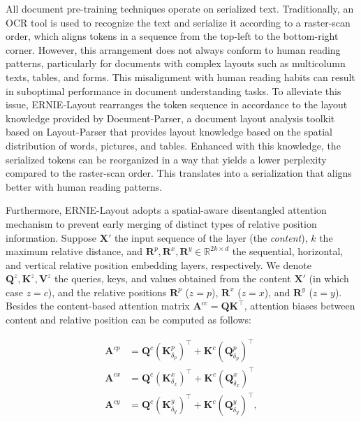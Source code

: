 All document pre-training techniques operate on serialized text. Traditionally, an OCR tool is used to recognize the text and serialize it according to a raster-scan order, which aligns tokens in a sequence from the top-left to the bottom-right corner. However, this arrangement does not always conform to human reading patterns, particularly for documents with complex layouts such as multicolumn texts, tables, and forms. This misalignment with human reading habits can result in suboptimal performance in document understanding tasks. To alleviate this issue, ERNIE-Layout \citep{peng2022ernie} rearranges the token sequence in accordance to the layout knowledge provided by Document-Parser, a document layout analysis toolkit based on Layout-Parser \citep{shen2021layoutparser} that provides layout knowledge based on the spatial distribution of words, pictures, and tables. Enhanced with this knowledge, the serialized tokens can be reorganized in a way that yields a lower perplexity compared to the raster-scan order. This translates into a serialization that aligns better with human reading patterns. 

Furthermore, ERNIE-Layout adopts a spatial-aware disentangled attention mechanism to prevent early merging of distinct types of relative position information. Suppose $\bm{X'}$ the input sequence of the layer (the \textit{content}), $k$ the maximum relative distance, and $\bm{R}^p, \bm{R}^x, \bm{R}^y \in \mathbb{R}^{2k \times d}$ the sequential, horizontal, and vertical relative position embedding layers, respectively. We denote $\bm{Q}^z, \bm{K}^z, \bm{V}^z$ the queries, keys, and values obtained from the content $\bm{X'}$ (in which case $z = c$), and the relative positions $\bm{R}^p$ ($z = p$), $\bm{R}^x$ ($z = x$), and $\bm{R}^y$ ($z = y$). Besides the content-based attention matrix $\bm{A}^{cc} = \bm{Q}\bm{K}^{\top}$, attention biases between content and relative position can be computed as follows:

\begin{equation}
\begin{aligned}
    \bm{A}^{cp} &= \bm{Q}^c (\bm{K}^p_{\delta_p})^{\top} + \bm{K}^c (\bm{Q}^p_{\delta_p})^{\top} \\
    \bm{A}^{cx} &= \bm{Q}^c (\bm{K}^x_{\delta_x})^{\top} + \bm{K}^c (\bm{Q}^x_{\delta_x})^{\top} \\
    \bm{A}^{cy} &= \bm{Q}^c (\bm{K}^y_{\delta_y})^{\top} + \bm{K}^c (\bm{Q}^y_{\delta_y})^{\top}, \\
\end{aligned}
\end{equation}

